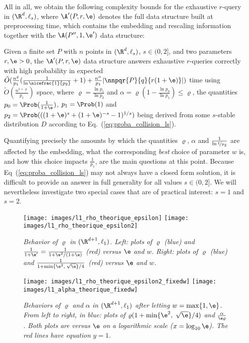 All in all, we obtain the following complexity bounds for the
exhaustive $r$-\pleb query in $(\R^d, \ell_s)$, where $\A'(P,r,\e)$
denotes the full data structure built at preprocessing time, which
contains the embedding and rescaling information together with the
$\A(P'', 1, \e')$ data structure:
\begin{thm} \label{thm:allnn_Rd}
  Given a finite set $P$ with $n$ points in $(\R^d, \ell_s)$, $s\in
  (0,2]$, and two parameters $r,\e> 0$, the $\A'(P, r, \e)$ data
    structure answers exhaustive $r$-\pleb queries correctly with high
    probability in expected $\tilde O(\frac{n^\varrho}{p_1}(\frac{1}{\ln
      \nicefrac{1}{p_2}}+1)+
    \frac{n^\alpha}{p_1}|\nnpqr{P}{q}{r(1+\e)}|)$ time using $\tilde
    O(\frac{n^{1+\varrho}}{p_1})$ space, where $\varrho=\frac{\ln p_1}{\ln p_2}$
    and $\alpha=\varrho(1-\frac{\ln p_0}{\ln p_1})\leq\varrho$, the
    quantities $p_0=\Prob(\frac{1}{1+\e})$, $p_1=\Prob(1)$ and
    $p_2=\Prob(((1+\e)^s + (1+\e)^{-s} - 1)^{1/s})$ being derived from
    some $s$-stable distribution $D$ according to
    Eq.~(\ref{eq:proba_collision_ls}).
\end{thm}
Quantifying precisely the amounts by which the quantities $\varrho$,
$\alpha$ and $\frac{1}{\ln\nicefrac{1}{p_2}}$ are affected by the
embedding, what the corresponding {\em best} choice of parameter $w$
is, and how this choice impacts $\frac{1}{p_1}$, are the main
questions at this point. Because Eq~(\ref{eq:proba_collision_ls}) may
not always have a closed form solution, it is difficult to provide an
answer in full generality for all values $s\in (0,2]$. We will
  nevertheless investigate two special cases that are of practical
  interest: $s=1$ and $s=2$.

\begin{figure}[!htb]
\centering
\texttt{[image: images/l1\_rho\_theorique\_epsilon]}
\texttt{[image: images/l1\_rho\_theorique\_epsilon2]}
\caption{\em Behavior of $\varrho$ in $(\R^{d+1}, \ell_1)$. Left: plots
  of $\varrho$ (blue) and $\frac{1}{1+\e'}=\frac{1}{1+\e^2/(1+\e)}$
  (red) versus $\e$ and $w$.  Right: plots of $\varrho$ (blue) and
  $\frac{1}{1+\min\{\e^2,\;\sqrt{\e}\}/4}$ (red) versus $\e$ and $w$.}
\label{fig:l1_rho_theorique}
\end{figure}

\begin{figure}[!htb]
\centering
\texttt{[image: images/l1\_rho\_theorique\_epsilon2\_fixedw]}
\texttt{[image: images/l1\_alpha\_theorique\_fixedw]}
\caption{\em Behaviors of $\varrho$ and $\alpha$ in $(\R^{d+1},
  \ell_1)$ after letting $w=\max\{1,\e\}$. From left to right, in
  blue: plots of $\varrho (1+\min\{\e^2,\;\sqrt{\e}\}/4)$ and
  $\frac{\alpha}{\e\varrho}$. Both plots are versus
  $\e$ on a logarithmic scale ($x=\log_{10} \e$). The red lines have
  equation $y=1$.}
\label{fig:l1_rho_alpha}
\end{figure}


